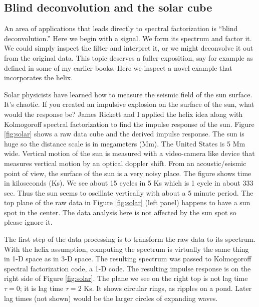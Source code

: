 \subsection{Blind deconvolution and the solar cube}
An area of applications that leads directly to spectral factorization
is ``blind deconvolution.''
Here we begin with a signal.
We form its spectrum and factor it.
We could simply inspect the filter and interpret it,
or we might deconvolve it out from the original data.
This topic deserves a fuller exposition, say for example
as defined in some of my earlier books.
Here we inspect a novel example that incorporates the helix.
\par
Solar physicists have learned how to measure
the seismic field of the sun surface.  It's chaotic.
If you created an impulsive explosion on the surface of the sun,
what would the response be?
James Rickett and I applied the helix idea along with Kolmogoroff
spectral factorization to find the impulse response of the sun.
Figure \ref{fig:solar} shows a raw data cube and the derived impulse response.
The sun is huge so the distance scale is in megameters (Mm).
The United States is 5 Mm wide.
Vertical motion of the sun is measured with a video-camera like device
that measures vertical motion by an optical doppler shift.
From an acoustic/seismic point of view,
the surface of the sun is a very noisy place.
The figure shows time in kiloseconds (Ks).
We see about 15 cycles in 5 Ks which is 1 cycle in about 333 sec.
Thus the sun seems to oscillate vertically with about a 5 minute period.
The top plane of the raw data
in Figure \ref{fig:solar} (left panel)
happens to have a sun spot in the center.
The data analysis here is not affected by the sun spot so please ignore it.
\par
The first step of the data processing is
to transform the raw data to its spectrum.
With the helix assumption, computing the spectrum is
virtually the same thing in 1-D space as in 3-D space.
The resulting spectrum was passed to Kolmogoroff spectral factorization code,
a 1-D code.
The resulting impulse response is on the right side of 
Figure \ref{fig:solar}.
The plane we see on the right top is not lag time $\tau=0$;
it is lag time $\tau=2$ Ks.
It shows circular rings, as ripples on a pond.
Later lag times (not shown) would be the larger circles of expanding waves.
